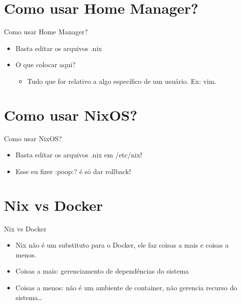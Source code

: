 \documentclass[presentation]{beamer}
\begin{document}
\section{Como usar Home Manager?}
\label{sec:orgd9426a1}
\begin{frame}[label={sec:org00928d0}]{Como usar Home Manager?}
\begin{itemize}
\item Basta editar os arquivos .nix
\item O que colocar aqui?
\begin{itemize}
\item Tudo que for relativo a algo específico de um usuário. Ex: vim.
\end{itemize}
\end{itemize}
\end{frame}

\section{Como usar NixOS?}
\label{sec:org19cbdc7}
\begin{frame}[label={sec:org873e58d}]{Como usar NixOS?}
\begin{itemize}
\item Basta editar os arquivos .nix em /etc/nix!
\item Esse eu fizer :poop:? é só dar rollback!
\end{itemize}
\end{frame}

\section{Nix vs Docker}
\label{sec:orge9c9094}
\begin{frame}[label={sec:orga3b82f0}]{Nix vs Docker}
\begin{itemize}
\item Nix não é um substituto para o Docker, ele faz coisas a mais e coisas a menos.
\item Coisas a mais: gerenciamento de dependências do sistema
\item Coisas a menos: não é um ambiente de container, não gerencia recurso do sistema\ldots{}
\end{itemize}
\end{frame}
\end{document}
